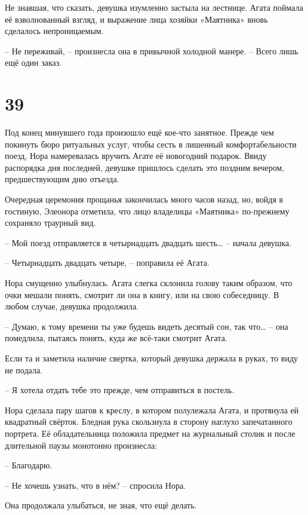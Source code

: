 \documentclass[
  a5paperpaper,
  DIV=11,
  numbers=noendperiod]{scrreprt}
\begin{document}
Не знавшая, что сказать, девушка изумленно застыла на лестнице. Агата
поймала её взволнованный взгляд, и выражение лица хозяйки «Маятника»
вновь сделалось непроницаемым.

-- Не переживай, -- произнесла она в привычной холодной манере. -- Всего
лишь ещё один заказ.

\section*{39}\label{39}


Под конец минувшего года произошло ещё кое-что занятное. Прежде чем
покинуть бюро ритуальных услуг, чтобы сесть в лишенный комфортабельности
поезд, Нора намеревалась вручить Агате её новогодний подарок. Ввиду
распорядка дня последней, девушке пришлось сделать это поздним вечером,
предшествующим дню отъезда.

Очередная церемония прощанья закончилась много часов назад, но, войдя в
гостиную, Элеонора отметила, что лицо владелицы «Маятника» по-прежнему
сохраняло траурный вид.

-- Мой поезд отправляется в четырнадцать двадцать шесть\ldots{} --
начала девушка.

-- Четырнадцать двадцать четыре, -- поправила её Агата.

Нора смущенно улыбнулась. Агата слегка склонила голову таким образом,
что очки мешали понять, смотрит ли она в книгу, или на свою собеседницу.
В любом случае, девушка продолжила.

-- Думаю, к тому времени ты уже будешь видеть десятый сон, так
что\ldots{} -- она помедлила, пытаясь понять, куда же всё-таки смотрит
Агата.

Если та и заметила наличие свертка, который девушка держала в руках, то
виду не подала.

-- Я хотела отдать тебе это прежде, чем отправиться в постель.

Нора сделала пару шагов к креслу, в котором полулежала Агата, и
протянула ей квадратный свёрток. Бледная рука скользнула в сторону
наглухо запечатанного портрета. Её обладательница положила предмет на
журнальный столик и после длительной паузы монотонно произнесла:

-- Благодарю.

-- Не хочешь узнать, что в нём? -- спросила Нора.

Она продолжала улыбаться, не зная, что ещё делать.
\end{document}
